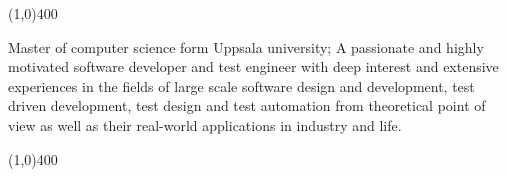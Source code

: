\documentclass{resume}
\author{Amin Khorsandi}
\begin{document}
\maketitle

\begin{center}
\line(1,0){400}
\end{center}

\par \begin{flushleft}Master of computer science form Uppsala university; 
A passionate and highly motivated software developer and test engineer with deep interest 
and extensive experiences in the fields of large scale software 
design and development, test driven development, test design and 
test automation from theoretical point of view as well as their 
real-world applications in industry and life.
\end{flushleft}

\begin{center}
\line(1,0){400}
\end{center}
\end{document}
